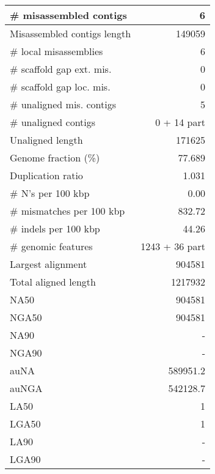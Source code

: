 \documentclass[12pt,a4paper]{article}
\begin{document}
\begin{table}[ht]
\begin{center}
\begin{tabular}{|l*{1}{|r}|}
\# misassembled contigs & 6 \\ \hline
Misassembled contigs length & 149059 \\ \hline
\# local misassemblies & 6 \\ \hline
\# scaffold gap ext. mis. & 0 \\ \hline
\# scaffold gap loc. mis. & 0 \\ \hline
\# unaligned mis. contigs & 5 \\ \hline
\# unaligned contigs & 0 + 14 part \\ \hline
Unaligned length & 171625 \\ \hline
Genome fraction (\%) & 77.689 \\ \hline
Duplication ratio & 1.031 \\ \hline
\# N's per 100 kbp & 0.00 \\ \hline
\# mismatches per 100 kbp & 832.72 \\ \hline
\# indels per 100 kbp & 44.26 \\ \hline
\# genomic features & 1243 + 36 part \\ \hline
Largest alignment & 904581 \\ \hline
Total aligned length & 1217932 \\ \hline
NA50 & 904581 \\ \hline
NGA50 & 904581 \\ \hline
NA90 & - \\ \hline
NGA90 & - \\ \hline
auNA & 589951.2 \\ \hline
auNGA & 542128.7 \\ \hline
LA50 & 1 \\ \hline
LGA50 & 1 \\ \hline
LA90 & - \\ \hline
LGA90 & - \\ \hline
\end{tabular}
\end{center}
\end{table}
\end{document}
